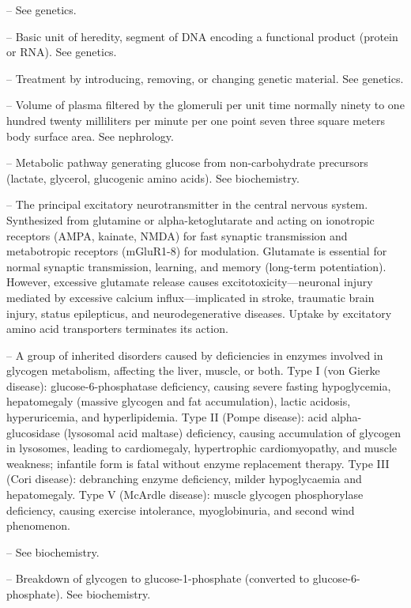 -- See genetics.

-- Basic unit of heredity, segment of DNA encoding a functional product (protein or RNA). See genetics.

-- Treatment by introducing, removing, or changing genetic material. See genetics.

-- Volume of plasma filtered by the glomeruli per unit time normally ninety to one hundred twenty milliliters per minute per one point seven three square meters body surface area. See nephrology.

-- Metabolic pathway generating glucose from non-carbohydrate precursors (lactate, glycerol, glucogenic amino acids). See biochemistry.

-- The principal excitatory neurotransmitter in the central nervous system. Synthesized from glutamine or alpha-ketoglutarate and acting on ionotropic receptors (AMPA, kainate, NMDA) for fast synaptic transmission and metabotropic receptors (mGluR1-8) for modulation. Glutamate is essential for normal synaptic transmission, learning, and memory (long-term potentiation). However, excessive glutamate release causes excitotoxicity—neuronal injury mediated by excessive calcium influx—implicated in stroke, traumatic brain injury, status epilepticus, and neurodegenerative diseases. Uptake by excitatory amino acid transporters terminates its action.

-- A group of inherited disorders caused by deficiencies in enzymes involved in glycogen metabolism, affecting the liver, muscle, or both. Type I (von Gierke disease): glucose-6-phosphatase deficiency, causing severe fasting hypoglycemia, hepatomegaly (massive glycogen and fat accumulation), lactic acidosis, hyperuricemia, and hyperlipidemia. Type II (Pompe disease): acid alpha-glucosidase (lysosomal acid maltase) deficiency, causing accumulation of glycogen in lysosomes, leading to cardiomegaly, hypertrophic cardiomyopathy, and muscle weakness; infantile form is fatal without enzyme replacement therapy. Type III (Cori disease): debranching enzyme deficiency, milder hypoglycaemia and hepatomegaly. Type V (McArdle disease): muscle glycogen phosphorylase deficiency, causing exercise intolerance, myoglobinuria, and second wind phenomenon.

-- See biochemistry.

-- Breakdown of glycogen to glucose-1-phosphate (converted to glucose-6-phosphate). See biochemistry.

